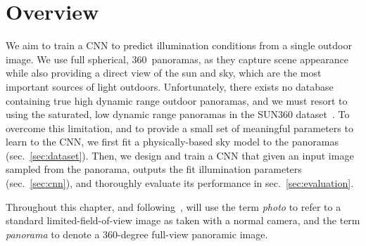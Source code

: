 \section{Overview}

We aim to train a CNN to predict illumination conditions from a single outdoor image. We use full spherical, 360\degree ~panoramas, as they capture scene appearance while also providing a direct view of the sun and sky, which are the most important sources of light outdoors. Unfortunately, there exists no database containing true high dynamic range outdoor panoramas, and we must resort to using the saturated, low dynamic range panoramas in the SUN360 dataset~\cite{xiao-cvpr-12}. To overcome this limitation, and to provide a small set of meaningful parameters to learn to the CNN, we first fit a physically-based sky model to the panoramas (sec.~\ref{sec:dataset}). Then, we design and train a CNN that given an input image sampled from the panorama, outputs the fit illumination parameters (sec.~\ref{sec:cnn}), and thoroughly evaluate its performance in sec.~\ref{sec:evaluation}.

Throughout this chapter, and following~\cite{xiao-cvpr-12}, will use the term \emph{photo} to refer to a standard limited-field-of-view image as taken with a normal camera, and the term \emph{panorama} to denote a 360-degree full-view panoramic image.